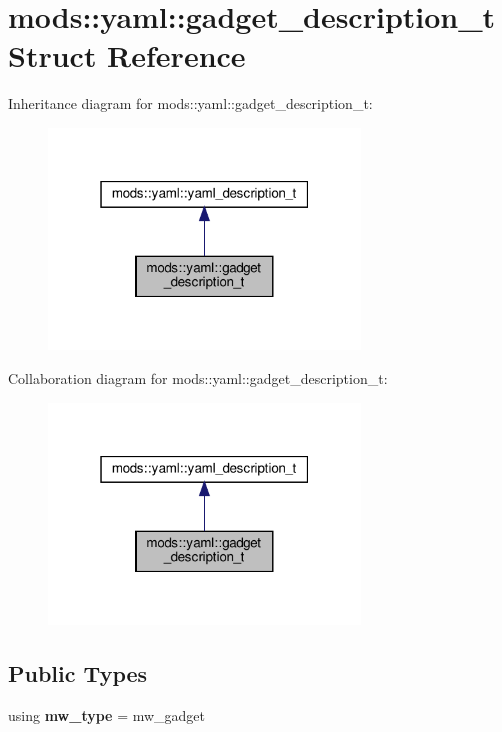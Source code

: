 \hypertarget{structmods_1_1yaml_1_1gadget__description__t}{}\section{mods\+:\+:yaml\+:\+:gadget\+\_\+description\+\_\+t Struct Reference}
\label{structmods_1_1yaml_1_1gadget__description__t}


Inheritance diagram for mods\+:\+:yaml\+:\+:gadget\+\_\+description\+\_\+t\+:\nopagebreak
\begin{figure}[H]
\begin{center}
\leavevmode
\includegraphics[width=235pt]{structmods_1_1yaml_1_1gadget__description__t__inherit__graph}
\end{center}
\end{figure}


Collaboration diagram for mods\+:\+:yaml\+:\+:gadget\+\_\+description\+\_\+t\+:\nopagebreak
\begin{figure}[H]
\begin{center}
\leavevmode
\includegraphics[width=235pt]{structmods_1_1yaml_1_1gadget__description__t__coll__graph}
\end{center}
\end{figure}
\subsection*{Public Types}
\begin{DoxyCompactItemize}
\item 
\mbox{\label{structmods_1_1yaml_1_1gadget__description__t_ad3c880621c2741aa91b5d3f63012c4a6}} 
using {\bfseries mw\+\_\+type} = mw\+\_\+gadget
\end{DoxyCompactItemize}
